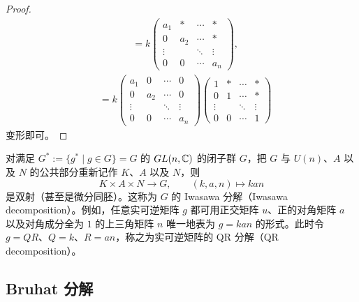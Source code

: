 \begin{proof}
\begin{equation}
  \begin{aligned}
    &=k\begin{pmatrix}
      a_1 & * & \cdots & *\\
      0 & a_2 & \cdots & *\\
      \vdots & & \ddots & \vdots\\
      0 & 0 & \cdots & a_n
    \end{pmatrix},
  \end{aligned}
  \tag{6.2.16}
\end{equation}
\begin{equation}
  \begin{aligned}
    &=k\begin{pmatrix}
      a_1 & 0 & \cdots & 0\\
      0 & a_2 & \cdots & 0\\
      \vdots & & \ddots & \vdots\\
      0 & 0 & \cdots & a_n
    \end{pmatrix}
    \begin{pmatrix}
      1 & * & \cdots & *\\
      0 & 1 & \cdots & *\\
      \vdots & & \ddots & \vdots\\
      0 & 0 & \cdots & 1
    \end{pmatrix}
  \end{aligned}
  \tag{6.2.17}
\end{equation}
变形即可。
\end{proof}

对满足 $G^*:=\{g^*\mid g\in G\}=G$ 的 $GL(n,\mathbb{C})$ 的闭子群 $G$，把 $G$ 与 $U(n)$、$A$ 以及 $N$ 的公共部分重新记作 $K$、$A$ 以及 $N$，则
\begin{equation}
  K\times A\times N\to G,\qquad (k,a,n)\mapsto kan
  \tag{6.2.18}
\end{equation}
是双射（甚至是微分同胚）。这称为 $G$ 的 Iwasawa 分解（Iwasawa decomposition）。例如，任意实可逆矩阵 $g$ 都可用正交矩阵 $u$、正的对角矩阵 $a$ 以及对角成分全为 $1$ 的上三角矩阵 $n$ 唯一地表为 $g=kan$ 的形式。此时令 $g=QR$、$Q=k$、$R=an$，称之为实可逆矩阵的 QR 分解（QR decomposition）。

\subsection{Bruhat 分解}

